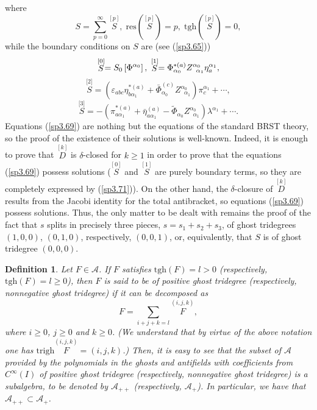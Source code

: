 \documentclass[a4paper,12pt]{article}
\newtheorem{definition}{Definition}
\begin{document}
where 
\begin{equation}
S=\sum\limits_{p=0}^{\infty }\stackrel{[p]}{S},\;\mathrm{res}\left( 
\stackrel{[p]}{S}\right) =p,\;\mathrm{tgh}\left( \stackrel{[p]}{S}\right) =0,
\label{sp3.70}
\end{equation}
while the boundary conditions on $S$ are (see (\ref{sp3.65})) 
\begin{equation}
\stackrel{\lbrack 0]}{S}=S_{0}\left[ \Phi ^{\alpha _{0}}\right] ,\;\stackrel{%
[1]}{S}=\Phi _{\alpha _{0}}^{*(a)}Z_{\;\;\alpha _{1}}^{\alpha _{0}}\eta
_{a}^{\alpha _{1}},  \label{sp3.71}
\end{equation}
\begin{equation}
\stackrel{\lbrack 2]}{S}=\left( \varepsilon _{abc}\eta _{b\alpha
_{1}}^{*(a)}+\bar{\Phi}_{\alpha _{0}}^{(c)}Z_{\;\;\alpha _{1}}^{\alpha
_{0}}\right) \pi _{c}^{\alpha _{1}}+\cdots ,  \label{sp3.72}
\end{equation}
\begin{equation}
\stackrel{\lbrack 3]}{S}=-\left( \pi _{a\alpha _{1}}^{*(a)}+\bar{\eta}%
_{a\alpha _{1}}^{(a)}-\tilde{\Phi}_{\alpha _{0}}Z_{\;\;\alpha _{1}}^{\alpha
_{0}}\right) \lambda ^{\alpha _{1}}+\cdots .  \label{sp3.73}
\end{equation}
Equations (\ref{sp3.69}) are nothing but the equations of the standard BRST
theory, so the proof of the existence of their solutions is well-known.
Indeed, it is enough to prove that $\stackrel{[k]}{D}$ is $\delta $-closed
for $k\geq 1$ in order to prove that the equations (\ref{sp3.69}) possess
solutions ($\stackrel{[0]}{S}$ and $\stackrel{[1]}{S}$ are purely boundary
terms, so they are completely expressed by (\ref{sp3.71})). On the other
hand, the $\delta $-closure of $\stackrel{[k]}{D}$ results from the Jacobi
identity for the total antibracket, so equations (\ref{sp3.69}) possess
solutions. Thus, the only matter to be dealt with remains the proof of the
fact that $s$ splits in precisely three pieces, $s=s_{1}+s_{2}+s_{3}$, of
ghost tridegrees $\left( 1,0,0\right) $, $\left( 0,1,0\right) $,
respectively, $\left( 0,0,1\right) $, or, equivalently, that $S$ is of ghost
tridegree $\left( 0,0,0\right) $.

\begin{definition}
Let $F\in \mathcal{A}$. If $F$ satisfies $\mathrm{tgh}\left( F\right) =l>0$
(respectively, $\mathrm{tgh}\left( F\right) =l\geq 0$), then $F$ is said to
be of positive ghost tridegree (respectively, nonnegative ghost tridegree)
if it can be decomposed as 
\begin{equation}
F=\sum\limits_{i+j+k=l}\stackrel{(i,j,k)}{F},  \label{sp3.74}
\end{equation}
where $i\geq 0$, $j\geq 0$ and $k\geq 0$. (We understand that by virtue of
the above notation one has $\mathrm{trigh}\stackrel{(i,j,k)}{F}=\left(
i,j,k\right) $.) Then, it is easy to see that the subset of $\mathcal{A}$
provided by the polynomials in the ghosts and antifields with coefficients
from $C^{\infty }\left( I\right) $ of positive ghost tridegree
(respectively, nonnegative ghost tridegree) is a subalgebra, to be denoted
by $\mathcal{A}_{++}$ (respectively, $\mathcal{A}_{+}$). In particular, we
have that $\mathcal{A}_{++}\subset \mathcal{A}_{+}$.
\end{definition}
\end{document}
